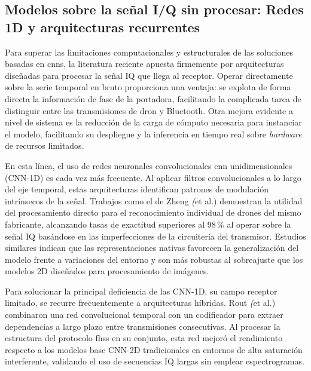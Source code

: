 \subsection{Modelos sobre la señal I/Q sin procesar: Redes 1D y arquitecturas recurrentes}

\label{subsec:cnn_1d}

Para superar las limitaciones computacionales y estructurales de las soluciones basadas en \glspl{cnn}, la literatura reciente apuesta firmemente por arquitecturas diseñadas para procesar la señal IQ que llega al receptor. Operar directamente sobre la serie temporal en bruto proporciona una ventaja: se explota de forma directa la información de fase de la portadora, facilitando la complicada tarea de distinguir entre las transmisiones de dron y Bluetooth. Otra mejora evidente a nivel de sistema es la reducción de la carga de cómputo necesaria para instanciar el modelo, facilitando su despliegue y la inferencia en tiempo real sobre \textit{hardware} de recursos limitados.

En esta línea, el uso de redes neuronales convolucionales \gls{cnn} unidimensionales (CNN-1D) es cada vez más frecuente. Al aplicar filtros convolucionales a lo largo del eje temporal, estas arquitecturas identifican patrones de modulación intrínsecos de la señal. Trabajos como el de Zheng \textit(et al.) \cite{zheng_deep_2025} demuestran la utilidad del procesamiento directo para el reconocimiento individual de drones del mismo fabricante, alcanzando tasas de exactitud superiores al 98\,\% al operar sobre la señal IQ basándose en las imperfecciones de la circuitería del transmisor. Estudios similares \cite{hossein_zadeh_one-dimensional_2025} indican que las representaciones nativas favorecen la generalización del modelo frente a variaciones del entorno y son más robustas al sobreajuste que los modelos 2D diseñados para procesamiento de imágenes.

Para solucionar la principal deficiencia de las CNN-1D, su campo receptor limitado, se recurre frecuentemente a arquitecturas híbridas. Rout \textit(et al.) \cite{rout_novel_2025} combinaron una red convolucional temporal con un codificador para extraer dependencias a largo plazo entre transmisiones consecutivas. Al procesar la estructura del protocolo \gls{fhss} en su conjunto, esta red mejoró el rendimiento respecto a los modelos base CNN-2D tradicionales en entornos de alta saturación interferente, validando el uso de secuencias IQ largas sin emplear espectrogramas.

